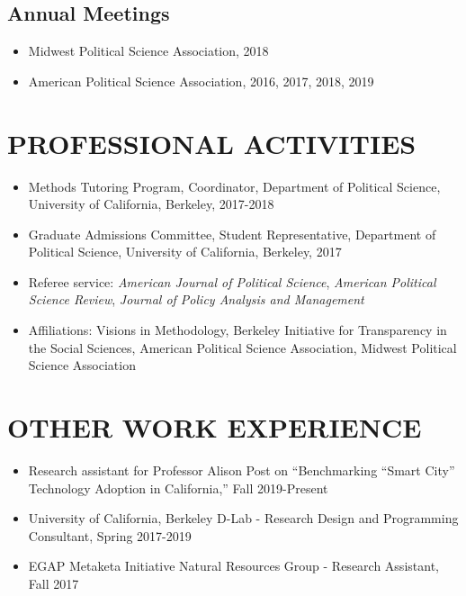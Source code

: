 \documentclass[11pt]{article}
\begin{document}
\subsection*{Annual Meetings}

\begin{itemize}[nosep]
\item[]Midwest Political Science Association, 2018
	\item[]American Political Science Association, 2016, 2017, 2018, 2019 	
	
	
\end{itemize}

\vspace{3mm}
\section*{PROFESSIONAL ACTIVITIES}


\begin{itemize}	

\item[]Methods Tutoring Program, Coordinator, Department of Political Science, University of California, Berkeley, 2017-2018
\item[]Graduate Admissions Committee, Student Representative, Department of Political Science, University of California, Berkeley, 2017
\item[]Referee service: \textit{American Journal of Political Science}, \textit{American Political Science Review}, \textit{Journal of Policy Analysis and Management}
\item[]Affiliations: Visions in Methodology, Berkeley Initiative for Transparency in the Social Sciences, American Political Science Association, Midwest Political Science Association
\end{itemize}


\vspace{3mm}
\section*{OTHER WORK EXPERIENCE}
	\begin{itemize}
	\item[]Research assistant for Professor Alison Post on ``Benchmarking ``Smart City'' Technology Adoption in California,'' Fall 2019-Present
	\item[]University of California, Berkeley D-Lab - Research Design and Programming Consultant, Spring 2017-2019
	\item[]EGAP Metaketa Initiative Natural Resources Group - Research Assistant, Fall 2017
\end{itemize}
\end{document}
